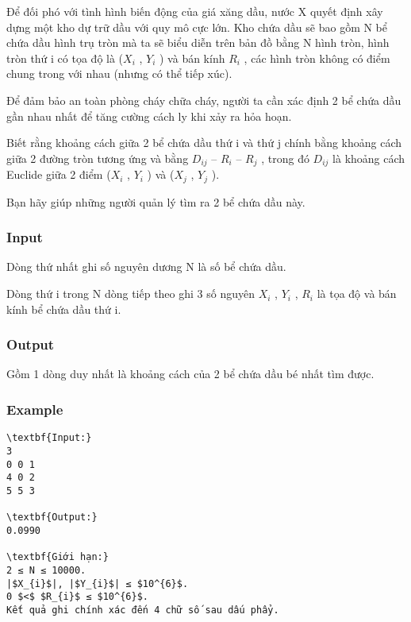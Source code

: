 



   Để đối phó với tình hình biến động của giá xăng dầu, nước X quyết định xây dựng một kho dự trữ dầu với quy mô cực lớn. Kho chứa dầu sẽ bao gồm N bể chứa dầu hình trụ tròn mà ta sẽ biểu diễn trên bản đồ bằng N hình tròn, hình tròn thứ i có tọa độ là ($X_{i}$   , $Y_{i}$   ) và bán kính $R_{i}$   , các hình tròn không có điểm chung trong với nhau (nhưng có thể tiếp xúc).  

   Để đảm bảo an toàn phòng cháy chữa cháy, người ta cần xác định 2 bể chứa dầu gần nhau nhất để tăng cường cách ly khi xảy ra hỏa hoạn.  

   Biết rằng khoảng cách giữa 2 bể chứa dầu thứ i và thứ j chính bằng khoảng cách giữa 2 đường tròn tương ứng và bằng $D_{ij}$   – $R_{i}$   – $R_{j}$   , trong đó $D_{ij}$   là khoảng cách Euclide giữa 2 điểm ($X_{i}$   , $Y_{i}$   ) và ($X_{j}$   , $Y_{j}$   ).  

   Bạn hãy giúp những người quản lý tìm ra 2 bể chứa dầu này.  

\subsubsection{   Input  }

   Dòng thứ nhất ghi số nguyên dương N là số bể chứa dầu.  

   Dòng thứ i trong N dòng tiếp theo ghi 3 số nguyên $X_{i}$   , $Y_{i}$   , $R_{i}$   là tọa độ và bán kính bể chứa dầu thứ i.  

\subsubsection{   Output  }

   Gồm 1 dòng duy nhất là khoảng cách của 2 bể chứa dầu bé nhất tìm được.  

\subsubsection{   Example  }
\begin{verbatim}
\textbf{Input:}
3
0 0 1
4 0 2
5 5 3

\textbf{Output:}
0.0990

\textbf{Giới hạn:}
2 ≤ N ≤ 10000. 
|$X_{i}$|, |$Y_{i}$| ≤ $10^{6}$.
0 $<$ $R_{i}$ ≤ $10^{6}$. 
Kết quả ghi chính xác đến 4 chữ số sau dấu phẩy.
\end{verbatim}
